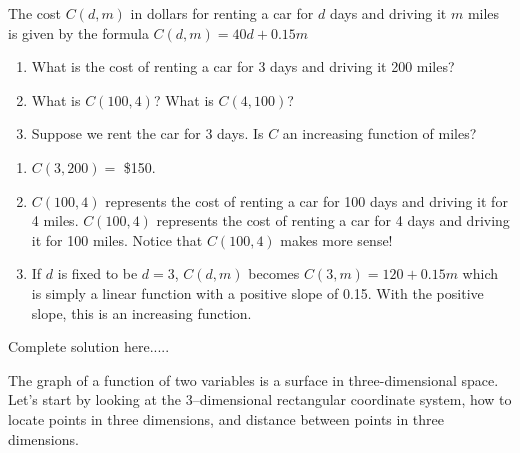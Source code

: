 \begin{example}
The cost $C(d,m)$ in dollars for renting a car for $d$ days and driving it $m$ miles is given by the formula $C(d,m)=40d+0.15m$
\renewcommand{\labelenumi}{\textbf{(\alph{enumi})}}
\begin{enumerate}[leftmargin=*]
    \item What is the cost of renting a car for 3 days and driving it 200 miles? \newpage
    \item What is $C(100,4)$? What is $C(4,100)$?\vspace*{1 in}
    \item Suppose we rent the car for 3 days. Is $C$ an increasing function of miles?\vspace*{1 in}

    \end{enumerate}
    \begin{sol}
    \renewcommand{\labelenumi}{\textbf{(\alph{enumi})}}
    \begin{enumerate}[leftmargin=*]
    \item $C(3,200)=$ \$150.  
    \item $C(100,4) $ represents the cost of renting a car for 100 days and driving it for 4 miles. $C(100,4) $ represents the cost of renting a car for 4 days and driving it for 100 miles. Notice that $C(100,4)$ makes more sense!
    \item If $d$ is fixed to be $d=3$, $C(d,m)$ becomes $C(3,m)=120+0.15m$ which is simply a linear function with a positive slope of 0.15. With the positive slope, this is an increasing function.
    \end{enumerate}
    \end{sol}
    \begin{solL}
    Complete solution here.....
    
    \end{solL}
    
\end{example}
\noindent The graph of a function of two variables is a surface in three-dimensional space. Let's start by looking at the 3–dimensional rectangular coordinate system, how to locate points in three dimensions, and distance between points in three dimensions.\\

